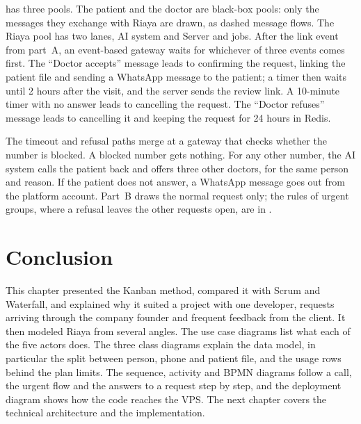  has three pools. The patient and the doctor are black-box pools: only the messages they exchange with Riaya are drawn, as dashed message flows. The Riaya pool has two lanes, AI system and Server and jobs. After the link event from part~A, an event-based gateway waits for whichever of three events comes first. The ``Doctor accepts'' message leads to confirming the request, linking the patient file and sending a WhatsApp message to the patient; a timer then waits until 2 hours after the visit, and the server sends the review link. A 10-minute timer with no answer leads to cancelling the request. The ``Doctor refuses'' message leads to cancelling it and keeping the request for 24 hours in Redis.

The timeout and refusal paths merge at a gateway that checks whether the number is blocked. A blocked number gets nothing. For any other number, the AI system calls the patient back and offers three other doctors, for the same person and reason. If the patient does not answer, a WhatsApp message goes out from the platform account. Part~B draws the normal request only; the rules of urgent groups, where a refusal leaves the other requests open, are in .

\section{Conclusion}
This chapter presented the Kanban method, compared it with Scrum and Waterfall, and explained why it suited a project with one developer, requests arriving through the company founder and frequent feedback from the client. It then modeled Riaya from several angles. The use case diagrams list what each of the five actors does. The three class diagrams explain the data model, in particular the split between person, phone and patient file, and the usage rows behind the plan limits. The sequence, activity and BPMN diagrams follow a call, the urgent flow and the answers to a request step by step, and the deployment diagram shows how the code reaches the VPS. The next chapter covers the technical architecture and the implementation.
